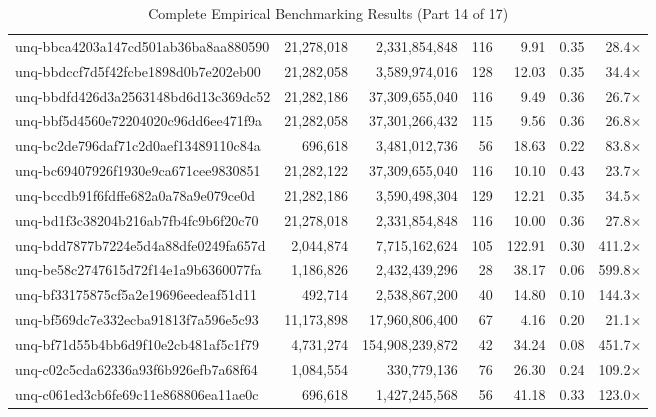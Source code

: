 \begin{table}[h!]
\begin{tabular}{lrrrrrr}
unq-bbca4203a147cd501ab36ba8aa880590 & 21,278,018 & 2,331,854,848 & 116 & 9.91 & 0.35 & 28.4$\times$ \\
unq-bbdccf7d5f42fcbe1898d0b7e202eb00 & 21,282,058 & 3,589,974,016 & 128 & 12.03 & 0.35 & 34.4$\times$ \\
unq-bbdfd426d3a2563148bd6d13c369dc52 & 21,282,186 & 37,309,655,040 & 116 & 9.49 & 0.36 & 26.7$\times$ \\
unq-bbf5d4560e72204020c96dd6ee471f9a & 21,282,058 & 37,301,266,432 & 115 & 9.56 & 0.36 & 26.8$\times$ \\
unq-bc2de796daf71c2d0aef13489110c84a & 696,618 & 3,481,012,736 & 56 & 18.63 & 0.22 & 83.8$\times$ \\
unq-bc69407926f1930e9ca671cee9830851 & 21,282,122 & 37,309,655,040 & 116 & 10.10 & 0.43 & 23.7$\times$ \\
unq-bccdb91f6fdffe682a0a78a9e079ce0d & 21,282,186 & 3,590,498,304 & 129 & 12.21 & 0.35 & 34.5$\times$ \\
unq-bd1f3c38204b216ab7fb4fc9b6f20c70 & 21,278,018 & 2,331,854,848 & 116 & 10.00 & 0.36 & 27.8$\times$ \\
unq-bdd7877b7224e5d4a88dfe0249fa657d & 2,044,874 & 7,715,162,624 & 105 & 122.91 & 0.30 & 411.2$\times$ \\
unq-be58c2747615d72f14e1a9b6360077fa & 1,186,826 & 2,432,439,296 & 28 & 38.17 & 0.06 & 599.8$\times$ \\
unq-bf33175875cf5a2e19696eedeaf51d11 & 492,714 & 2,538,867,200 & 40 & 14.80 & 0.10 & 144.3$\times$ \\
unq-bf569dc7e332ecba91813f7a596e5c93 & 11,173,898 & 17,960,806,400 & 67 & 4.16 & 0.20 & 21.1$\times$ \\
unq-bf71d55b4bb6d9f10e2cb481af5c1f79 & 4,731,274 & 154,908,239,872 & 42 & 34.24 & 0.08 & 451.7$\times$ \\
unq-c02c5cda62336a93f6b926efb7a68f64 & 1,084,554 & 330,779,136 & 76 & 26.30 & 0.24 & 109.2$\times$ \\
unq-c061ed3cb6fe69c11e868806ea11ae0c & 696,618 & 1,427,245,568 & 56 & 41.18 & 0.33 & 123.0$\times$ \\
\bottomrule
\end{tabular}
\caption{Complete Empirical Benchmarking Results (Part 14 of 17)}
\end{table}

\clearpage

